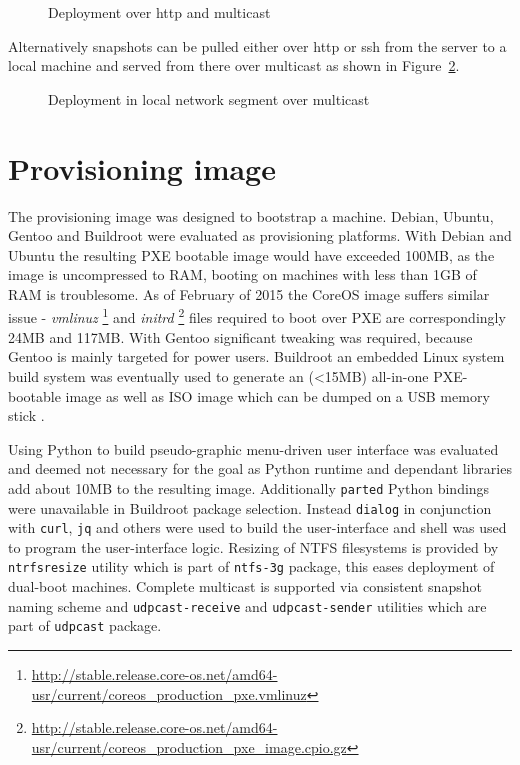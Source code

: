 \documentclass[a4paper,11pt]{kth-mag}
\begin{document}
\begin{figure}[!htb]
\centering
\scalebox{0.5}{}
\caption{Deployment over \acrshort{http} and multicast}
\label{fig:butterknife-usecase-tee}
\end{figure}

Alternatively snapshots can be pulled either over \acrshort{http} or \acrshort{ssh} from
the server to a local machine and served from there over multicast
as shown in Figure~\ref{fig:butterknife-usecase-multicast}.

\begin{figure}[!htb]
\centering
\scalebox{0.5}{}
\caption{Deployment in local network segment over multicast}
\label{fig:butterknife-usecase-multicast}
\end{figure}



\section{Provisioning image}

The provisioning image was designed to bootstrap a machine.
Debian, Ubuntu, Gentoo and Buildroot were evaluated as
provisioning platforms.
With Debian and Ubuntu the resulting PXE bootable
image would have exceeded 100MB, as the image
is uncompressed to RAM, booting on machines with
less than 1GB of RAM is troublesome.
As of February of 2015 the CoreOS image suffers similar issue -
\emph{vmlinuz}
\footnote{\url{http://stable.release.core-os.net/amd64-usr/current/coreos_production_pxe.vmlinuz}}
and
\emph{initrd}
\footnote{\url{http://stable.release.core-os.net/amd64-usr/current/coreos_production_pxe_image.cpio.gz}}
files required to boot over PXE are correspondingly 24MB and 117MB.
With Gentoo significant tweaking was required, because Gentoo is
mainly targeted for power users.
Buildroot
an embedded Linux system build system
was eventually used to generate an (<15MB)
all-in-one PXE-bootable image as well as ISO image
which can be dumped on a USB memory stick \cite{tools-for-embedded-linux-dev}.

Using Python to build pseudo-graphic menu-driven user interface was
evaluated and deemed not necessary for the goal as Python runtime and
dependant libraries add about 10MB to the resulting image.
Additionally \lstinline!parted! Python bindings were unavailable
in Buildroot package selection.
Instead \lstinline!dialog! in conjunction with
\lstinline!curl!, \lstinline!jq! and others were used to build the user-interface
and shell was used to program the user-interface logic.
Resizing of NTFS filesystems is provided by \lstinline!ntrfsresize! utility
which is part of \lstinline!ntfs-3g! package, this eases deployment of
dual-boot machines.
Complete multicast is supported via consistent snapshot naming scheme
and \lstinline!udpcast-receive! and \lstinline!udpcast-sender! utilities which
are part of \lstinline!udpcast! package.
\end{document}
